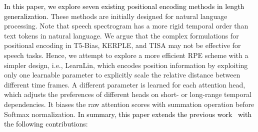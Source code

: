 \documentclass[journal]{IEEEtran}
\begin{document}
\textcolor{black}{In this paper, we explore seven existing positional encoding methods in length generalization.} 
These methods are initially designed for natural language processing. Note that speech spectrogram has a more rigid temporal order than text tokens in natural language. We argue that the complex formulations for positional encoding in T5-Bias, KERPLE, and TISA may not be effective for speech tasks. Hence, we attempt to explore a more efficient RPE scheme with a simpler design, i.e., LearnLin, which encodes position information by exploiting only one learnable parameter to explicitly scale the relative distance between different time frames. A different parameter is learned for each attention head, which adjusts the preferences of different heads on short- or long-range temporal dependencies. It biases the raw attention scores with summation operation before Softmax normalization. \textcolor{black}{In summary, this paper extends the previous work~\cite{zhang2024exploration} with the following contributions:}


\end{document}
